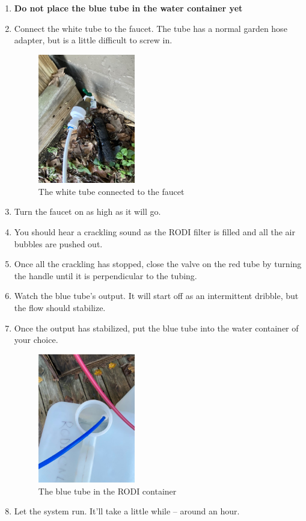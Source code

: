 \documentclass{report}
\begin{document}
\begin{enumerate}
    
    \item \textbf{Do not place the blue tube in the water container yet}

    \item Connect the white tube to the faucet. The tube has a normal garden hose adapter, but is a little difficult to screw
    in.
    \begin{figure}[H]
        \centering
        \includegraphics[width=0.4\textwidth, angle=-90]{WhiteLine.jpg}
        \caption{The white tube connected to the faucet}
    \end{figure}
    
    \item Turn the faucet on as high as it will go.
    \item You should hear a crackling sound as the RODI filter is filled and all the air bubbles are pushed out.
    \item Once all the crackling has stopped, close the valve on the red tube by turning the handle until it is perpendicular
    to the tubing.
    \item Watch the blue tube's output. It will start off as an intermittent dribble, but the flow should stabilize. 
    \item Once the output has stabilized, put the blue tube into the water container of your choice.
    \begin{figure}[H]
        \centering
        \includegraphics[width=0.4\textwidth, angle=-90]{BlueLine.jpg}
        \caption{The blue tube in the RODI container}
    \end{figure}
    
    \item Let the system run. It'll take a little while -- around an hour.
\end{enumerate}
\end{document}
